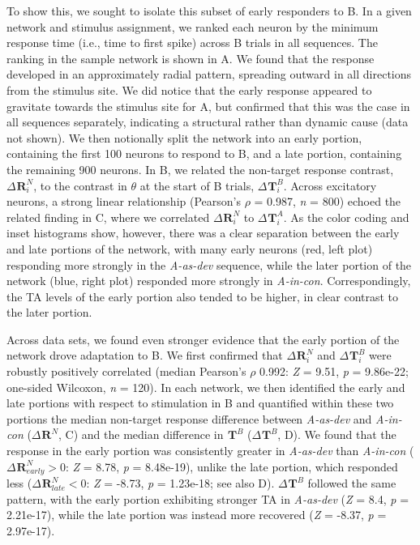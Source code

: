 \documentclass[9pt,lineno,onehalfspacing]{elife}
\newcommand{\dev}{\textit{A-as-dev}}
\newcommand{\msc}{\textit{A-in-con}}
\newcommand{\R}[3][]{{}^{#1}_{}\boldsymbol R^{#2}_{#3}}
\newcommand{\T}[3][]{{}^{#1}_{}\boldsymbol T^{#2}_{#3}}
\begin{document}
To show this, we sought to isolate this subset of early responders to B. In a given network and stimulus assignment, we ranked each neuron by the minimum response time (i.e., time to first spike) across B trials in all sequences. The ranking in the sample network is shown in A. We found that the response developed in an approximately radial pattern, spreading outward in all directions from the stimulus site. We did notice that the early response appeared to gravitate towards the stimulus site for A, but confirmed that this was the case in all sequences separately, indicating a structural rather than dynamic cause (data not shown). We then notionally split the network into an early portion, containing the first 100 neurons to respond to B, and a late portion, containing the remaining 900 neurons. In B, we related the non-target response contrast, $\Delta \R{N}{i}$, to the contrast in $\theta$ at the start of B trials, $\Delta \T{B}{i}$. Across excitatory neurons, a strong linear relationship (Pearson's $\rho$ = 0.987, \textit{n} = 800) echoed the related finding in C, where we correlated $\Delta \R{N}{i}$ to $\Delta \T{A}{i}$. As the color coding and inset histograms show, however, there was a clear separation between the early and late portions of the network, with many early neurons (red, left plot) responding more strongly in the \dev{} sequence, while the later portion of the network (blue, right plot) responded more strongly in \msc{}. Correspondingly, the TA levels of the early portion also tended to be higher, in clear contrast to the later portion.

Across data sets, we found even stronger evidence that the early portion of the network drove adaptation to B. We first confirmed that $\Delta \R{N}{i}$ and $\Delta \T{B}{i}$ were robustly positively correlated (median Pearson's $\rho$ 0.992: \textit{Z} = 9.51, \textit{p} = 9.86e-22; one-sided Wilcoxon, \textit{n} = 120). In each network, we then identified the early and late portions with respect to stimulation in B and quantified within these two portions the median non-target response difference between \dev{} and \msc{} ($\Delta \R{N}{}$, C) and the median difference in $\T{B}{}$ ($\Delta \T{B}{}$, D). We found that the response in the early portion was consistently greater in \dev{} than \msc{} ($\Delta \R{N}{early} > 0$: \textit{Z} = 8.78, \textit{p} = 8.48e-19), unlike the late portion, which responded less ($\Delta \R{N}{late} < 0$: \textit{Z} = -8.73, \textit{p} = 1.23e-18; see also D). $\Delta \T{B}{}$ followed the same pattern, with the early portion exhibiting stronger TA in \dev{} (\textit{Z} = 8.4, \textit{p} = 2.21e-17), while the late portion was instead more recovered (\textit{Z} = -8.37, \textit{p} = 2.97e-17).
\end{document}
